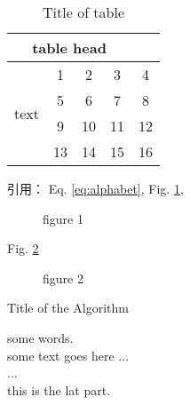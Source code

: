 \documentclass[UTF8,a4paper,10pt, twocolumn]{ctexart}
\begin{document}
    \begin{table}[htbp]
		\caption{Title of table} \label{tab:table}
		\centering
		\addtolength{\tabcolsep}{-0mm} %
		\begin{tabular}{ccccc}
			\toprule[0.75pt]	%
			\multicolumn{4}{c}{table head} \\
			\midrule[0.5pt]	%
			\multirow{4}{*}{text} & 1 & 2 & 3 & 4 \\  %
			& 5 & 6 & 7 & 8 \\
			\cmidrule[0.5pt]{2-4}	%
			& 9 & 10 & 11 & 12 \\
			& 13 & 14 & 15 & 16 \\
			\bottomrule[0.75pt]	%
		\end{tabular}
	\end{table}
    引用： Eq. \eqref{eq:alphabet}, Fig. \ref{figure:zju1},  \\
    \begin{figure}[htbp] 
		\centering
		\caption{figure 1}		
		\label{figure:zju1}
	\end{figure}

     Fig. \ref{figure:zju2}
    \begin{figure}[htbp] 		
		\centering
		\caption{figure 2}
		\label{figure:zju2}		
	\end{figure}

    \begin{algorithm}
		\caption{Title of the Algorithm}
		\label{algo:ref}
		\begin{algorithmic}[1]
			\REQUIRE some words.  %
			\ENSURE ~\\           %
			some text goes here ... \\
			\STATE ... \\  %
			\ENDWHILE
			\RETURN this is the lat part.  %
		\end{algorithmic}
	\end{algorithm}
\end{document}
